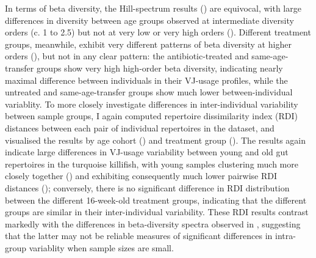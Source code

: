 In terms of beta diversity, the Hill-spectrum results () are equivocal, with large differences in diversity between age groups observed at intermediate diversity orders (c. 1 to 2.5) but not at very low or very high orders (). Different treatment groups, meanwhile, exhibit very different patterns of beta diversity at higher orders (), but not in any clear pattern: the antibiotic-treated and same-age-transfer groups show very high high-order beta diversity, indicating nearly maximal difference between individuals in their VJ-usage profiles, while the untreated and same-age-transfer groups show much lower between-individual variablity. To more closely investigate differences in inter-individual variability between sample groups, I again computed repertoire dissimilarity index (RDI) distances between each pair of individual repertoires in the dataset, and visualised the results by age cohort () and treatment group (). The results again indicate large differences in VJ-usage variability between young and old gut repertoires in the turquoise killifish, with young samples clustering much more closely together () and exhibiting consequently much lower pairwise RDI distances (); conversely, there is no significant difference in RDI distribution between the different 16-week-old treatment groups, indicating that the different groups are similar in their inter-individual variability. These RDI results contrast markedly with the differences in beta-diversity spectra observed in , suggesting that the latter may not be reliable measures of significant differences in intra-group variablity when sample sizes are small.

